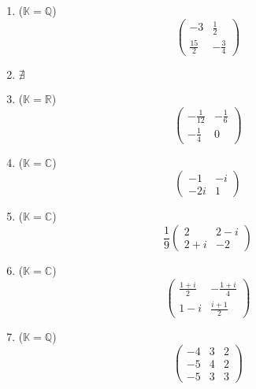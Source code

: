 \documentclass{article}
\theoremstyle{plain}
\theoremstyle{definition}
\theoremstyle{remark}
\begin{document}
\begin{multicols}{2}
\begin{enumerate}
    \item ($\mathbb{K}=\mathbb{Q}$)
    \[
      \begin{pmatrix}
      -3 & \frac{1}{2} \\
      \frac{15}{2} & -\frac{3}{4}
      \end{pmatrix}
    \]

    \item $\nexists$
  
    \item($\mathbb{K}=\mathbb{R}$)
    \[
      \begin{pmatrix}
      -\frac{1}{12} & -\frac{1}{6} \\
      -\frac{1}{4} & 0
      \end{pmatrix}
    \]
  
    \item ($\mathbb{K}=\mathbb{C}$)
    \[
      \begin{pmatrix}
      -1 & -i \\
      -2i & 1
      \end{pmatrix}
    \]
  
    \item ($\mathbb{K}=\mathbb{C}$)
    \[
      \dfrac{1}{9}\begin{pmatrix}
      2 & 2 - i \\
      2 + i & -2
      \end{pmatrix}
    \]
  
    \item ($\mathbb{K}=\mathbb{C}$)
    \[
      \begin{pmatrix}
        \frac{1+i}{2} & -\frac{1+i}{4} \\
      1-i & \frac{i+1}{2}
      \end{pmatrix}
    \]
    
    \item ($\mathbb{K}=\mathbb{Q}$)
    \[
      \begin{pmatrix}
        -4&3&2\\
        -5&4&2\\
        -5&3&3
      \end{pmatrix}
    \]
\end{enumerate}
\end{multicols}

\vspace{10pt}
\end{document}
